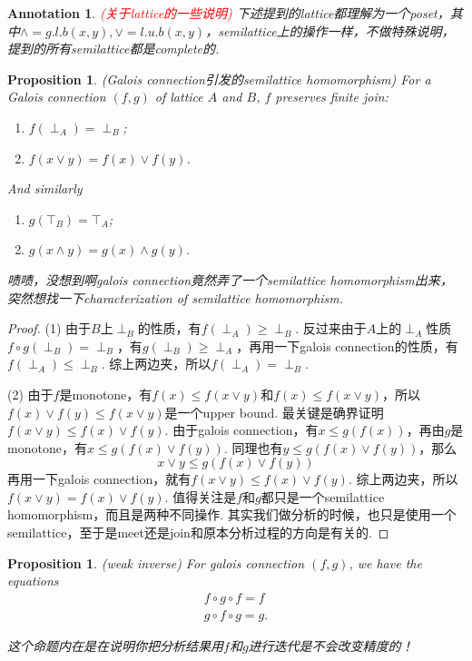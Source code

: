 \documentclass{article}
\newtheorem{proposition}[theorem]{Proposition}
\newtheorem{annotation}[theorem]{Annotation}
\newcommand{\redt}[1]{\textcolor{red}{#1}}
\begin{document}
\newpage

\begin{annotation}
\rm \redt{(关于lattice的一些说明)} 下述提到的lattice都理解为一个poset，其中$\wedge=g.l.b(x,y),\vee = l.u.b(x,y)$，semilattice上的操作一样，不做特殊说明，提到的所有semilattice都是complete的. 
\end{annotation}

\begin{proposition}
\rm {\color{red} (Galois connection引发的semilattice homomorphism)} For a Galois connection $(f,g)$ of lattice $A$ and $B$, $f$ preserves finite join:
\begin{enumerate}
	\item $f(\perp_A) = \perp_B$;
	\item $f(x \vee y) = f(x) \vee f(y)$.
\end{enumerate}
And similarly 
\begin{enumerate}
	\item $g(\top_B) = \top_A$;
	\item $g(x \wedge y) = g(x) \wedge g(y)$.
\end{enumerate}

{\color{blue} 啧啧，没想到啊galois connection竟然弄了一个semilattice homomorphism出来，突然想找一下characterization of semilattice homomorphism}. 
\end{proposition}

\begin{proof}
(1) 由于$B$上$\perp_B$的性质，有$f(\perp_A) \geq \perp_B$. 反过来由于$A$上的$\perp_A$性质$f\circ g(\perp_B) = \perp_B$，有$g(\perp_B) \geq \perp_A$，再用一下galois connection的性质，有$f(\perp_A) \leq \perp_B$. 综上两边夹，所以$f(\perp_A) = \perp_B$.

(2) 由于$f$是monotone，有$f(x) \leq f(x \vee y)$和$f(x) \leq f(x \vee y)$，所以$f(x) \vee f(y) \leq f(x \vee y)$是一个upper bound. 最关键是确界证明$f(x \vee y) \leq f(x) \vee f(y)$. 由于galois connection，有$x \leq g(f(x))$，再由$g$是monotone，有$x \leq g(f(x) \vee f(y))$. 同理也有$y \leq g(f(x) \vee f(y))$，那么
$$
x \vee y \leq g(f(x) \vee f(y))
$$
再用一下galois connection，就有$f(x \vee y) \leq f(x) \vee f(y)$. 综上两边夹，所以$f(x \vee y) = f(x) \vee f(y)$. {\color{red} 值得关注是$f$和$g$都只是一个semilattice homomorphism，而且是两种不同操作}. 其实我们做分析的时候，也只是使用一个semilattice，至于是meet还是join和原本分析过程的方向是有关的. 
\end{proof}

\begin{proposition}
\rm {\color{red} (weak inverse)} For galois connection $(f,g)$, we have the equations
$$
\begin{aligned}
f \circ g \circ f  = f \\
g \circ f \circ g = g.
\end{aligned}
$$

{\color{blue} 这个命题内在是在说明你把分析结果用$f$和$g$进行迭代是不会改变精度的！}
\end{proposition}
\end{document}
